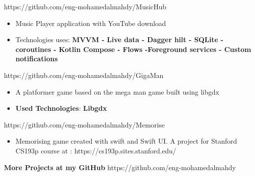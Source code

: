\documentclass[10pt,a4paper,ragged2e,withhyper]{altacv}
\begin{document}
\begin{paracol}{1}
        {\cvrepo{|\faGithub\faAndroid}
        {https://github.com/eng-mohamedalmahdy/MusicHub}
        }{}{}
        \begin{itemize}
            \item \textbf{} Music Player application with YouTube download
            \item Technologies uses: \textbf{MVVM - Live data - Dagger hilt - SQLite - coroutines - Kotlin Compose - Flows -\linebreak Foreground services - Custom notifications}
        \end{itemize}
        \divider


        {\cvrepo{|\faGithub\faGamepad}
        {https://github.com/eng-mohamedalmahdy/GigaMan}}{}{}
        \begin{itemize}
            \item \textbf{}A platformer game based on the mega man game built using libgdx
            \item \textbf{Used Technologies}: \textbf{Libgdx}
        \end{itemize}
        \divider

        {\cvrepo{|\faGithub\faApple}
        {https://github.com/eng-mohamedalmahdy/Memorise}
        }{}{}
        \begin{itemize}
            \item \textbf{} Memorising game created with swift and Swift UI. \linebreak
            A project for Stanford CS193p course at : https://cs193p.sites.stanford.edu/
        \end{itemize}
        \divider

        \begin{center}
            \textbf{\Large More Projects at my GitHub}
            {\cvrepo{\faGithub}
            {https://github.com/eng-mohamedalmahdy}}{}{}
        \end{center}
        \divider
    \end{paracol}
\end{document}
